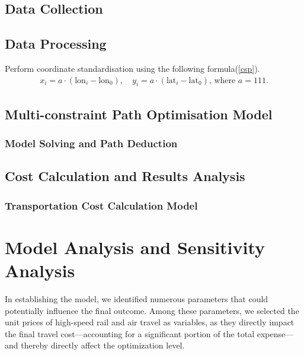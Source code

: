 \documentclass{mcmthesis} %
\begin{document}
\subsection{Data Collection}

\subsection{Data Processing}
Perform coordinate standardisation using the following formula(\autoref{csp}).
\begin{align}\label{csp}
x_i = a \cdot (\text{lon}_i - \text{lon}_0), \quad y_i = a \cdot (\text{lat}_i - \text{lat}_0)
\text{, where $a = 111$.}
\end{align}

\subsection{Multi-constraint Path Optimisation Model}

\subsubsection{Model Solving and Path Deduction}

\subsection{Cost Calculation and Results Analysis}
\subsubsection{Transportation Cost Calculation Model}

\section{Model Analysis and Sensitivity Analysis}
In establishing the model, we identified numerous parameters that could potentially influence the final outcome. Among 
these parameters, we selected the unit prices of high-speed rail and air travel as variables, as they directly impact 
the final travel cost—accounting for a significant portion of the total expense—and thereby directly affect the 
optimization level.\\
\end{document}
